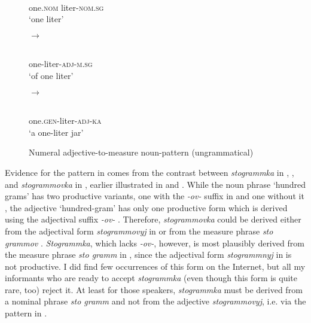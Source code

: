 \documentclass[output=paper]{langscibook}
\begin{document}
\begin{figure}\small
\hfill\begin{minipage}{\widthof{\hspace{8pt}one.\textsc{nom} liter-\textsc{nom.sg}}}
\\
\hspace{4pt}one.\textsc{nom} liter-\textsc{nom.sg}\\
\glt \small `one liter'                                       
\end{minipage}\hfill$\rightarrow$\hfill
\begin{minipage}{\widthof{\hspace{10pt}one-liter-\textsc{adj}-\textsc{m.sg}}}
\\
\hspace{8pt}one-liter-\textsc{adj}-\textsc{m.sg}\\
\glt \small `of one liter'                                  
\end{minipage}\hfill$\rightarrow$\hfill
\begin{minipage}{\widthof{\hspace{10pt}one.\textsc{gen}-liter-\textsc{adj}-\textsc{ka}}}
\\
\hspace{8pt}one.\textsc{gen}-liter-\textsc{adj}-\textsc{ka}\\
\glt \small `a one-liter jar'\\
\end{minipage}
\caption{Numeral adjective-to-measure noun-pattern (ungrammatical)}\label{ex:khrizmann:10}
\end{figure}

Evidence for the pattern in  comes from the contrast between \textit{sto\-gramm\-ka} in , , and \textit{stogrammovka} in , earlier illustrated in  and . While the noun phrase `hundred grams' has two productive variants, one with the \textit{-ov-} suffix in  and one without it , the adjective `hundred-gram' has only one productive form which is derived using the adjectival suffix \textit{-ov-} . Therefore, \textit{stogrammovka} could be derived either from the adjectival form \textit{stogrammovyj} in  or from the measure phrase \textit{sto grammov} . \textit{Stogrammka}, which lacks \textit{-ov-}, however, is most plausibly derived from the measure phrase \textit{sto gramm} in , since the adjectival form \textit{stogrammnyj} in  is not productive. I did find few occurrences of this form on the Internet, but all my informants who are ready to accept \textit{stogrammka} (even though this form is quite rare, too) reject it. At least for those speakers, \textit{stogrammka} must be derived from a nominal phrase \textit{sto gramm} and not from the adjective \textit{stogrammovyj}, i.e. via the pattern in .
\end{document}
